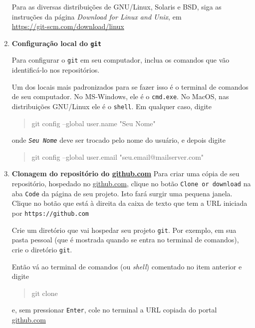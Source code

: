 \documentclass[10pt,a4paper]{article}
\begin{document}
\begin{enumerate}
		Para as diversas distribuições de GNU/Linux, Solaris e BSD, siga as instruções da página {\em Download for Linux and Unix}, em \\
        \url{https://git-scm.com/download/linux}

                
        \item {\bf Configuração local do {\tt git}}
        
		Para configurar o {\tt git} em seu computador, inclua os comandos que vão identificá-lo nos repositórios. 
		
		Um dos locais mais padronizados para se fazer isso é o terminal de comandos de seu computador. No MS-Windows, ele é o {\tt cmd.exe}.  No MacOS, nas distribuições GNU/Linux ele é o {\tt shell}. Em qualquer caso, digite 
		\begin{quote}
		\begin{tt}		
			git config --global user.name "Seu Nome"
		\end{tt}			
		\end{quote} 
		onde {\tt {\em Seu Nome}} deve ser trocado pelo nome do usuário, e depois digite
		\begin{quote}
		\begin{tt}		
			git config --global user.email "seu.email@mailserver.com"
		\end{tt}			
		\end{quote} 
	
                
	\item {\bf Clonagem do repositório do \url{github.com}}
    	Para criar uma cópia de seu repositório, hospedado no \url{github.com}, clique no botão {\tt Clone or download} na aba {\tt Code} da página de seu projeto. Isto fará surgir uma pequena janela. Clique no botão que está à direita da caixa de texto que tem a URL iniciada por {\tt https://github.com}
    	
    	Crie um diretório que vai hospedar seu projeto {\tt git}. Por exemplo, em sua pasta pessoal (que é mostrada quando se entra no terminal de comandos), crie o diretório {\tt git}. 
    	
    	Então vá ao terminal de comandos (ou {\em shell}) comentado no item anterior e digite 
		\begin{quote}
		\begin{tt}		
			git clone
		\end{tt}			
		\end{quote} 
		e, sem pressionar {\tt Enter}, cole no terminal a URL copiada do portal \url{github.com}
		

\end{enumerate}
\end{document}
